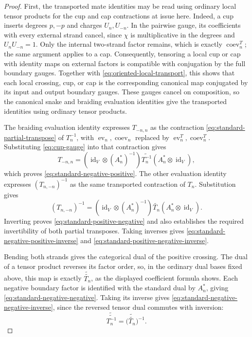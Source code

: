 \documentclass[11pt,a4paper]{article}
\newcommand{\ot}{\otimes}
\newcommand{\id}{\operatorname{id}}
\newcommand{\ev}{\operatorname{ev}}
\newcommand{\coev}{\operatorname{coev}}
\theoremstyle{definition}
\theoremstyle{remark}
\begin{document}
\begin{proof}
First, the transported mate identities may be read using ordinary
local tensor products for the cup and cap contractions at issue here.
Indeed, a cup inserts degrees \(p,-p\) and charges \(U_n,U_{-n}\).
In the pairwise gauge, its coefficients with every external strand
cancel, since \(\chi\) is multiplicative in the degrees and
\(U_nU_{-n}=1\).  Only the internal two-strand factor remains,
which is exactly \(\coev_n^T\); the same argument applies to a cap.
Consequently, tensoring a local cup or cap with identity maps on
external factors is compatible with conjugation by the full boundary
gauges.  Together with \eqref{eq:oriented-local-transport}, this shows
that each local crossing, cup, or cap is the corresponding canonical
map conjugated by its input and output boundary gauges.
These gauges cancel on composition, so the canonical snake and
braiding evaluation identities give the transported identities using
ordinary tensor products.

The braiding evaluation identity expresses \(T_{-n,n}\) as the
contraction \eqref{eq:standard-partial-transpose} of \(T_n^{-1}\),
with \(\ev_n,\coev_n\) replaced by \(\ev_n^T,\coev_n^T\).
Substituting \eqref{eq:cup-gauge} into that contraction gives
\[
 T_{-n,n}
 =(\id_V\ot(A_n^*)^{-1})
 \widetilde{T_n^{-1}}(A_n^*\ot\id_V),
\]
which proves \eqref{eq:standard-negative-positive}.
The other evaluation identity expresses \((T_{n,-n})^{-1}\) as the
same transported contraction of \(T_n\).  Substitution gives
\[
 (T_{n,-n})^{-1}
 =(\id_V\ot(A_n^*)^{-1})\widetilde{T_n}
 (A_n^*\ot\id_V).
\]
Inverting proves \eqref{eq:standard-positive-negative} and also
establishes the required invertibility of both partial transposes.
Taking inverses gives
\eqref{eq:standard-negative-positive-inverse} and
\eqref{eq:standard-positive-negative-inverse}.

Bending both strands gives the categorical dual of the positive
crossing.  The dual of a tensor product reverses its factor order,
so, in the ordinary dual bases fixed above, this map is exactly
\(\widetilde{\widetilde{T_n}}\), as the displayed coefficient formula
shows.  Each negative boundary factor is identified with the
standard dual by \(A_n^*\), giving
\eqref{eq:standard-negative-negative}.  Taking its inverse gives
\eqref{eq:standard-negative-negative-inverse}, since the reversed
tensor dual commutes with inversion:
\[
 \widetilde{\widetilde{T_n^{-1}}}
 =\bigl(\widetilde{\widetilde{T_n}}\bigr)^{-1}.
\]
\end{proof}
\end{document}
